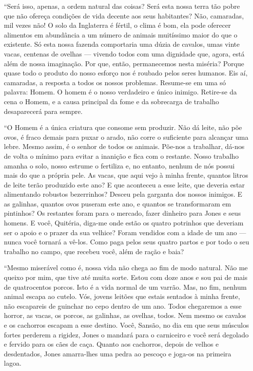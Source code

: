 ``Será isso, apenas, a ordem natural das coisas? Será esta nossa terra tão pobre que não ofereça condições de vida decente aos seus habitantes? Não, camaradas, mil vezes não! O solo da Inglaterra é fértil, o clima é bom, ela pode oferecer alimentos em abundância a um número de animais muitíssimo maior do que o existente. Só esta nossa fazenda comportaria uma dúzia de cavalos, umas vinte vacas, centenas de ovelhas --- vivendo todos com uma dignidade que, agora, está além de nossa imaginação. Por que, então, permanecemos nesta miséria? Porque quase todo o produto do nosso esforço nos é roubado pelos seres humanos. Eis aí, camaradas, a resposta a todos os nossos problemas. Resume-se em uma só palavra: Homem. O homem é o nosso verdadeiro e único inimigo. Retire-se da cena o Homem, e a causa principal da fome e da sobrecarga de trabalho desaparecerá para sempre.

``O Homem é a única criatura que consome sem produzir. Não dá leite, não põe ovos, é fraco demais para puxar o arado, não corre o suficiente para alcançar uma lebre. Mesmo assim, é o senhor de todos os animais. Põe-nos a trabalhar, dá-nos de volta o mínimo para evitar a inanição e fica com o restante. Nosso trabalho amanha o solo, nosso estrume o fertiliza e, no entanto, nenhum de nós possui mais do que a própria pele. As vacas, que aqui vejo à minha frente, quantos litros de leite terão produzido este ano? E que aconteceu a esse leite, que deveria estar alimentando robustos bezerrinhos? Desceu pela garganta dos nossos inimigos. E as galinhas, quantos ovos puseram este ano, e quantos se transformaram em pintinhos? Os restantes foram para o mercado, fazer dinheiro para Jones e seus homens. E você, Quitéria, diga-me onde estão os quatro potrinhos que deveriam ser o apoio e o prazer da sua velhice? Foram vendidos com a idade de um ano --- nunca você tornará a vê-los. Como paga pelos seus quatro partos e por todo o seu trabalho no campo, que recebeu você, além de ração e baia?

``Mesmo miserável como é, nossa vida não chega ao fim de modo natural. Não me queixo por mim, que tive até muita sorte. Estou com doze anos e sou pai de mais de quatrocentos porcos. Isto é a vida normal de um varrão. Mas, no fim, nenhum animal escapa ao cutelo. Vós, jovens leitões que estais sentados à minha frente, não escapareis de guinchar no cepo dentro de um ano. Todos chegaremos a esse horror, as vacas, os porcos, as galinhas, as ovelhas, todos. Nem mesmo os cavalos e os cachorros escapam a esse destino. Você, Sansão, no dia em que seus músculos fortes perderem a rigidez, Jones o mandará para o carniceiro e você será degolado e fervido para os cães de caça. Quanto aos cachorros, depois de velhos e desdentados, Jones amarra-lhes uma pedra ao pescoço e joga-os na primeira lagoa.

